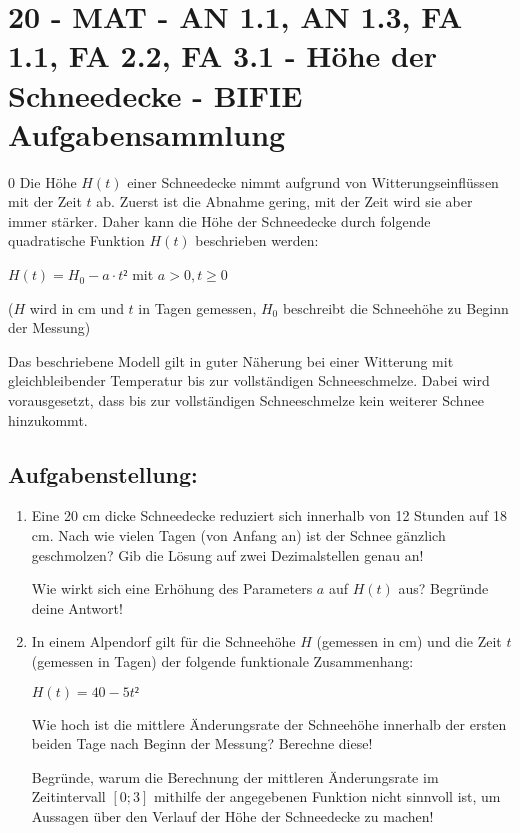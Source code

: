 \section{20 - MAT - AN 1.1, AN 1.3, FA 1.1, FA 2.2, FA 3.1 - Höhe der Schneedecke - BIFIE Aufgabensammlung}

\begin{langesbeispiel} \item[0] %
				Die Höhe $H(t)$ einer Schneedecke nimmt aufgrund von Witterungseinflüssen mit der Zeit $t$ ab. Zuerst ist die Abnahme gering, mit der Zeit wird sie aber immer stärker. Daher kann die Höhe der Schneedecke durch folgende quadratische Funktion $H(t)$ beschrieben werden:
				\begin{center} $H(t)=H_0-a\cdot t²$ mit $a>0,t\geq 0$\end{center}
($H$ wird in cm und $t$ in Tagen gemessen, $H_0$ beschreibt die Schneehöhe zu Beginn der Messung)

Das beschriebene Modell gilt in guter Näherung bei einer Witterung mit gleichbleibender Temperatur bis zur vollständigen Schneeschmelze. Dabei wird vorausgesetzt, dass bis zur vollständigen Schneeschmelze kein weiterer Schnee hinzukommt.

\subsection{Aufgabenstellung:}
\begin{enumerate}
	\item Eine 20 cm dicke Schneedecke reduziert sich innerhalb von 12 Stunden auf 18 cm. Nach wie vielen Tagen (von Anfang an) ist der Schnee gänzlich geschmolzen? Gib die Lösung auf zwei Dezimalstellen genau an! 
	
Wie wirkt sich eine Erhöhung des Parameters $a$ auf $H(t)$ aus? Begründe deine Antwort! 

\item In einem Alpendorf gilt für die Schneehöhe $H$ (gemessen in cm) und die Zeit $t$ (gemessen in Tagen) der folgende funktionale Zusammenhang:
\begin{center}$H(t)=40-5t²$\end{center}
Wie hoch ist die mittlere Änderungsrate der Schneehöhe innerhalb der ersten beiden Tage nach Beginn der Messung? Berechne diese!

Begründe, warum die Berechnung der mittleren Änderungsrate im Zeitintervall $[0; 3]$ mithilfe der angegebenen Funktion nicht sinnvoll ist, um Aussagen über den Verlauf der Höhe der Schneedecke zu machen!     
	

\end{enumerate}
\end{langesbeispiel}
